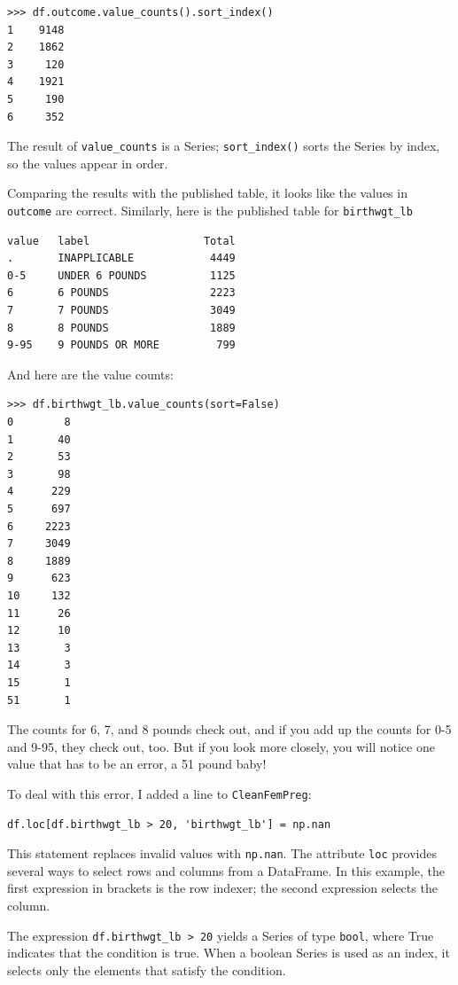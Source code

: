 \documentclass[12pt]{book}
\begin{document}
\begin{verbatim}
>>> df.outcome.value_counts().sort_index()
1    9148
2    1862
3     120
4    1921
5     190
6     352
\end{verbatim}

The result of \verb"value_counts" is a Series;
\verb"sort_index()" sorts the Series by index, so the values
appear in order.

Comparing the results with the published table, it looks like the
values in {\tt outcome} are correct.  Similarly, here is the published
table for \verb"birthwgt_lb"

\begin{verbatim}
value   label                  Total
.       INAPPLICABLE            4449
0-5     UNDER 6 POUNDS          1125
6       6 POUNDS                2223
7       7 POUNDS                3049
8       8 POUNDS                1889
9-95    9 POUNDS OR MORE         799
\end{verbatim}

And here are the value counts:

\begin{verbatim}
>>> df.birthwgt_lb.value_counts(sort=False)
0        8
1       40
2       53
3       98
4      229
5      697
6     2223
7     3049
8     1889
9      623
10     132
11      26
12      10
13       3
14       3
15       1
51       1
\end{verbatim}

The counts for 6, 7, and 8 pounds check out, and if you add
up the counts for 0-5 and 9-95, they check out, too.  But
if you look more closely, you will notice one value that has to be
an error, a 51 pound baby!

To deal with this error, I added a line to {\tt CleanFemPreg}:

\begin{verbatim}
df.loc[df.birthwgt_lb > 20, 'birthwgt_lb'] = np.nan
\end{verbatim}

This statement replaces invalid values with {\tt np.nan}.
The attribute {\tt loc} provides several ways to select
rows and columns from a DataFrame.  In this example, the
first expression in brackets is the row indexer; the second
expression selects the column.

The expression \verb"df.birthwgt_lb > 20" yields a Series of type
{\tt bool}, where True indicates that the condition is true.  When a
boolean Series is used as an index, it selects only the elements that
satisfy the condition.
  
\end{document}
